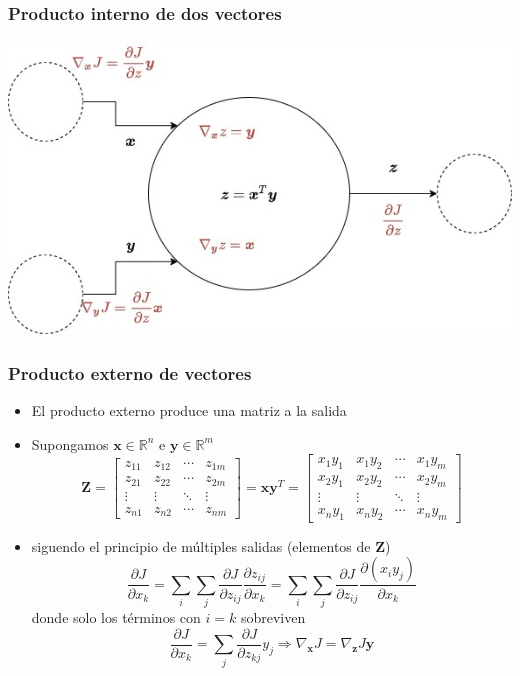 \documentclass{beamer}
\begin{document}
\begin{frame}
\frametitle{Producto interno de dos vectores}
\includegraphics[scale=0.35]{im27}
\end{frame}
\begin{frame}
\frametitle{Producto externo de vectores}
\begin{itemize}
\item El producto externo produce una matriz a la salida
\item Supongamos $\boldsymbol{x}\in \mathbb{R}^{n}$ e $\boldsymbol{y} \in \mathbb{R}^{m}$
\begin{equation*}
\boldsymbol{Z}= \begin{bmatrix}
z_{11} & z_{12} & \cdots & z_{1m}\\
z_{21} & z_{22} & \cdots & z_{2m}\\
\vdots & \vdots & \ddots & \vdots \\
z_{n1} & z_{n2} & \cdots & z_{nm}
\end{bmatrix} =\boldsymbol{xy}^T= \begin{bmatrix}
x_1y_1 & x_1y_2 & \cdots & x_1y_m\\
x_2y_1 & x_2y_2 & \cdots & x_2y_m\\
\vdots & \vdots & \ddots & \vdots \\
x_ny_1 & x_ny_2 & \cdots & x_ny_m
\end{bmatrix}
\end{equation*}
\item siguendo el principio de múltiples salidas (elementos de $\boldsymbol{Z}$)
\begin{equation*}
\frac{\partial J}{\partial x_k}=\sum_i\sum_j \frac{\partial J}{\partial z_{ij}}\frac{\partial z_{ij}}{\partial x_k}= \sum_i\sum_j \frac{\partial J}{\partial z_{ij}} \frac{\partial {(x_iy_j)}}{\partial x_k}
\end{equation*}
donde solo los términos con $i=k$ sobreviven 
\begin{equation*}
\frac{\partial J}{\partial x_k}=\sum_j\frac{\partial J}{\partial z_{kj}}y_j \Rightarrow \nabla_{\boldsymbol{x}}J=\nabla_{\boldsymbol{z}} J \boldsymbol{y}
\end{equation*}
\end{itemize}
\end{frame}
\end{document}
